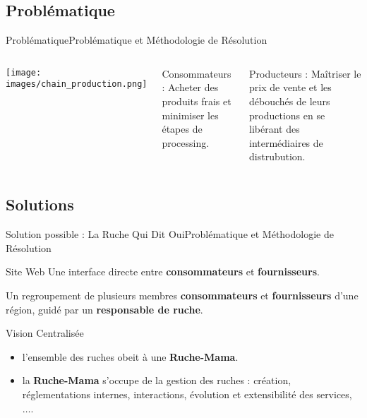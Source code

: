 \documentclass[usenames,dvipsnames]{beamer}
\begin{document}
\subsection{Problématique}
\begin{frame}{Problématique}{Problématique et Méthodologie de Résolution}
\begin{columns}[onlytextwidth, T]
  \column{55mm}
    \texttt{[image: images/chain\_production.png]}

  \column{\dimexpr\linewidth-40mm-2mm}
    \begin{block}{Consommateurs :}
    Acheter des produits frais et minimiser les étapes de processing.
    \end{block}

    \begin{block}{Producteurs :}
      Maîtriser le prix de vente et les débouchés de leurs productions en se libérant des intermédiaires de distrubution.
    \end{block}
\end{columns}
\end{frame}

\subsection{Solutions}
\begin{frame}{Solution possible : La Ruche Qui Dit Oui}{Problématique et Méthodologie de Résolution}
\begin{block}{Site Web}
Une interface directe entre \textbf{consommateurs} et \textbf{fournisseurs}.
\end{block}

\begin{definition}[Ruche]
Un regroupement de plusieurs membres \textbf{consommateurs} et \textbf{fournisseurs} d'une région, guidé par un \textbf{responsable de ruche}.
\end{definition}

\begin{block}{Vision Centralisée}
\begin{itemize}
  \item l'ensemble des ruches obeit à une \textbf{Ruche-Mama}.
  \item la \textbf{Ruche-Mama} s'occupe de la gestion des ruches : création, réglementations internes, interactions, évolution et extensibilité des services, $\dots$.
\end{itemize}
\end{block}
\end{frame}
\end{document}
